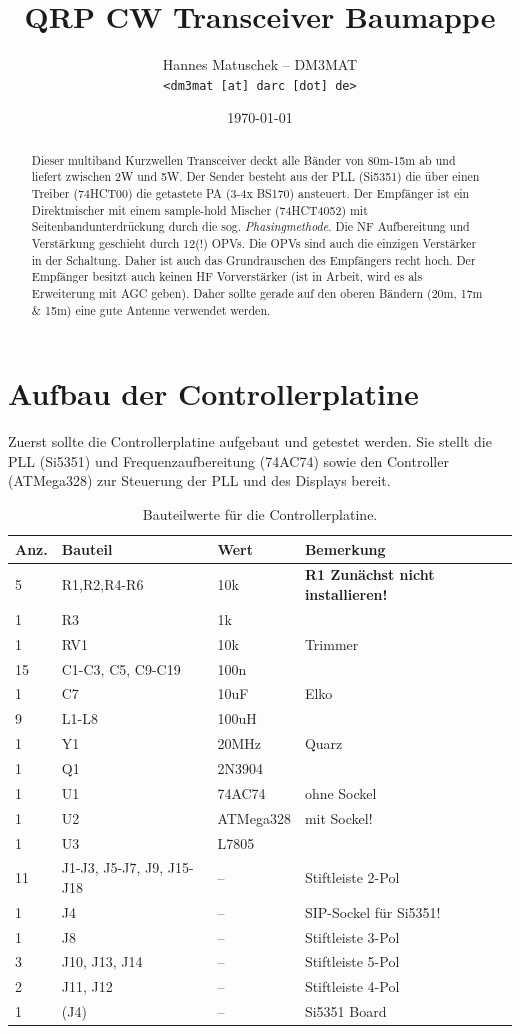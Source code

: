\documentclass[10pt, a4paper]{paper}
\title{QRP CW Transceiver Baumappe}
\author{Hannes Matuschek -- DM3MAT\\\texttt{<dm3mat [at] darc [dot] de>}}
\date{\today}
\newcommand{\warn}[1]{\textbf{#1}}
\begin{document}
\maketitle

\begin{abstract}
Dieser multiband Kurzwellen Transceiver deckt alle Bänder von 80m-15m ab und liefert zwischen 2W und 5W. Der Sender besteht aus der PLL (Si5351) die über einen Treiber (74HCT00) die getastete PA (3-4x BS170) ansteuert. Der Empfänger ist ein Direktmischer mit einem sample-hold Mischer (74HCT4052) mit Seitenbandunterdrückung durch die sog. \emph{Phasingmethode}. Die NF Aufbereitung und Verstärkung geschieht durch 12(!) OPVs. Die OPVs sind auch die einzigen Verstärker in der Schaltung. Daher ist auch das Grundrauschen des Empfängers recht hoch. Der Empfänger besitzt auch keinen HF Vorverstärker (ist in Arbeit, wird es als Erweiterung mit AGC geben). Daher sollte gerade auf den oberen Bändern (20m, 17m \& 15m) eine gute Antenne verwendet werden. 
\end{abstract}


\section{Aufbau der Controllerplatine} \label{sec:ctrl}
Zuerst sollte die Controllerplatine aufgebaut und getestet werden. Sie stellt die PLL (Si5351) und Frequenzaufbereitung (74AC74) sowie den Controller (ATMega328) zur Steuerung der PLL und des Displays bereit. 

\begin{table}[!ht]
\centering
\begin{tabular}{|l|l|l|l|}
\hline 
Anz. & Bauteil & Wert & Bemerkung \\ \hline 
5    & R1,R2,R4-R6 & 10k & \warn{R1 Zunächst nicht installieren!} \\
1    & R3 & 1k & \\
1    & RV1 & 10k & Trimmer\\
15   & C1-C3, C5, C9-C19 & 100n & \\
1    & C7 & 10uF & Elko \\
9    & L1-L8 & 100uH & \\
1    & Y1 & 20MHz & Quarz \\
1    & Q1 & 2N3904 & \\
1    & U1 & 74AC74 & ohne Sockel \\
1    & U2 & ATMega328 & mit Sockel! \\
1    & U3 & L7805 & \\
11   & J1-J3, J5-J7, J9, J15-J18 & -- & Stiftleiste 2-Pol \\
1    & J4 & -- & SIP-Sockel für Si5351! \\
1    & J8 & -- & Stiftleiste 3-Pol \\
3    & J10, J13, J14 & -- & Stiftleiste 5-Pol \\
2    & J11, J12 & -- & Stiftleiste 4-Pol \\
1    & (J4) & -- & Si5351 Board \\\hline
\end{tabular}
\caption{Bauteilwerte für die Controllerplatine.}
\end{table}
\end{document}
